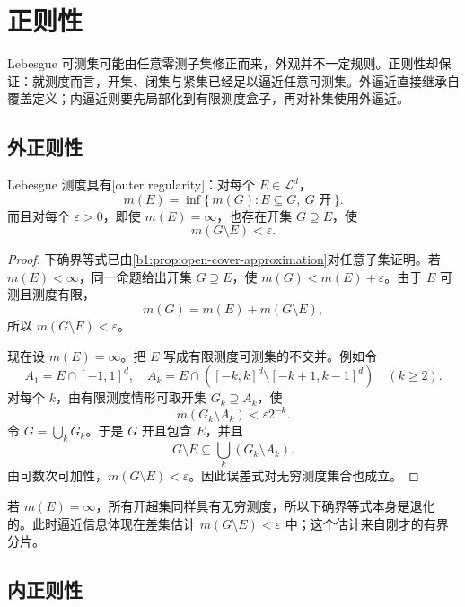 \section{正则性}
\label{b1:sec:0303}

Lebesgue 可测集可能由任意零测子集修正而来，外观并不一定规则。正则性却保证：就测度而言，开集、闭集与紧集已经足以逼近任意可测集。外逼近直接继承自覆盖定义；内逼近则要先局部化到有限测度盒子，再对补集使用外逼近。

\subsection{外正则性}
\label{b1:subsec:030301}

\begin{theorem}
\label{b1:thm:outer-regular}
Lebesgue 测度具有[outer regularity]：对每个 \(E\in\mathcal L^d\)，
\[
m(E)=\inf\{\,m(G):E\subseteq G,\ G\text{ 开}\,\}.
\]
而且对每个 \(\varepsilon>0\)，即使 \(m(E)=\infty\)，也存在开集 \(G\supseteq E\)，使
\[
m(G\setminus E)<\varepsilon.
\]
\end{theorem}
\begin{proof}
下确界等式已由\cref{b1:prop:open-cover-approximation}对任意子集证明。若 \(m(E)<\infty\)，同一命题给出开集 \(G\supseteq E\)，使
\(m(G)<m(E)+\varepsilon\)。由于 \(E\) 可测且测度有限，
\[
m(G)=m(E)+m(G\setminus E),
\]
所以 \(m(G\setminus E)<\varepsilon\)。

现在设 \(m(E)=\infty\)。把 \(E\) 写成有限测度可测集的不交并。例如令
\[
A_1=E\cap[-1,1]^d,
\quad
A_k=E\cap\left([-k,k]^d\setminus[-k+1,k-1]^d\right)
\quad(k\geq2).
\]
对每个 \(k\)，由有限测度情形可取开集 \(G_k\supseteq A_k\)，使
\[
m(G_k\setminus A_k)<\varepsilon2^{-k}.
\]
令 \(G=\bigcup_kG_k\)。于是 \(G\) 开且包含 \(E\)，并且
\[
G\setminus E
\subseteq\bigcup_k(G_k\setminus A_k).
\]
由可数次可加性，\(m(G\setminus E)<\varepsilon\)。因此误差式对无穷测度集合也成立。
\end{proof}

若 \(m(E)=\infty\)，所有开超集同样具有无穷测度，所以下确界等式本身是退化的。此时逼近信息体现在差集估计 \(m(G\setminus E)<\varepsilon\) 中；这个估计来自刚才的有界分片。

\subsection{内正则性}
\label{b1:subsec:030302}

